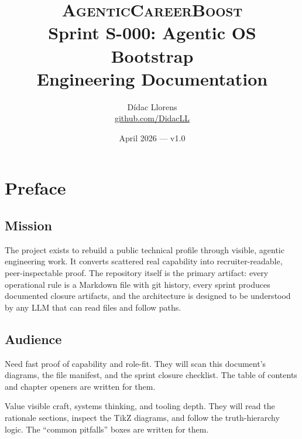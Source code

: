 \documentclass[a4paper,11pt,openany]{report}
\title{%
  \textsc{AgenticCareerBoost}\\[0.4em]
  \Large Sprint S-000: Agentic OS Bootstrap\\[0.3em]
  \large Engineering Documentation%
}
\author{Dídac Llorens \\ \small \href{https://github.com/DidacLL}{github.com/DidacLL}}
\date{April 2026 --- v1.0}
\begin{document}
\maketitle
\tableofcontents
\newpage

\chapter{Preface}


\section{Mission}

The \projectName{} project exists to rebuild a public technical profile through
visible, agentic engineering work. It converts scattered real capability into
recruiter-readable, peer-inspectable proof. The repository itself is the primary
artifact: every operational rule is a Markdown file with git history, every
sprint produces documented closure artifacts, and the architecture is designed
to be understood by any LLM that can read files and follow paths.

\section{Audience}

\begin{description}[style=nextline]
  \item[Recruiters] Need fast proof of capability and role-fit. They will scan
    this document's diagrams, the file manifest, and the sprint closure
    checklist. The table of contents and chapter openers are written for them.
  \item[Engineering peers] Value visible craft, systems thinking, and tooling
    depth. They will read the rationale sections, inspect the TikZ diagrams,
    and follow the truth-hierarchy logic. The ``common pitfalls'' boxes are
    written for them.
\end{description}
\end{document}
